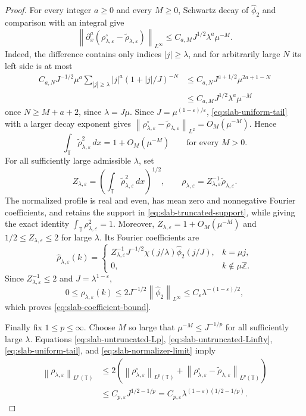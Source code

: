 \documentclass[12pt,reqno,letterpaper]{amsart}
\numberwithin{equation}{section}
\theoremstyle{definition}
\newcommand{\T}{\mathbb T}
\newcommand{\Z}{\mathbb Z}
\newcommand{\eps}{\varepsilon}
\newcommand{\la}{\lambda}
\newcommand{\norm}[1]{\left\lVert #1\right\rVert}
\newcommand{\abs}[1]{\left\lvert #1\right\rvert}
\begin{document}
\begin{proof}
For every integer $a\geq0$ and every $M\geq0$, Schwartz decay of
$\widehat\phi_2$ and comparison with an integral give
\begin{equation}\label{eq:slab-uniform-tail}
 \norm{\partial_x^a(\rho^\circ_{\la,\eps}
       -\widetilde\rho_{\la,\eps})}_{L^\infty}
 \leq C_{a,M}J^{1/2}\la^a\mu^{-M}.
\end{equation}
Indeed, the difference contains only indices $\abs j\geq\la$, and for
arbitrarily large $N$ its left side is at most
\begin{align*}
 C_{a,N}J^{-1/2}\mu^a
 \sum_{\abs j\geq\la}\abs j^a(1+\abs j/J)^{-N}
 &\leq C_{a,N}J^{a+1/2}\mu^{2a+1-N}\\
 &\leq C_{a,M}J^{1/2}\la^a\mu^{-M}
\end{align*}
once $N\geq M+a+2$, since $\la=J\mu$.
Since $J=\mu^{(1-\eps)/\eps}$, \eqref{eq:slab-uniform-tail} with a
larger decay exponent gives
$\norm{\rho^\circ_{\la,\eps}-\widetilde\rho_{\la,\eps}}_{L^2}
=O_M(\mu^{-M})$.  Hence
\begin{equation}\label{eq:slab-normalizer-limit}
 \int_\T\widetilde\rho_{\la,\eps}^2\,dx
 =1+O_M(\mu^{-M})
 \qquad\text{for every }M>0.
\end{equation}
For all sufficiently large admissible $\la$, set
\begin{equation*}
 Z_{\la,\eps}
 =\left(\int_\T\widetilde\rho_{\la,\eps}^2\,dx\right)^{1/2},
 \qquad
 \rho_{\la,\eps}
 =Z_{\la,\eps}^{-1}\widetilde\rho_{\la,\eps}.
\end{equation*}
The normalized profile is real and even, has mean zero and nonnegative
Fourier coefficients, and retains the support in
\eqref{eq:slab-truncated-support}, while giving the exact identity
$\int_\T\rho_{\la,\eps}^2=1$.  Moreover,
$Z_{\la,\eps}=1+O_M(\mu^{-M})$ and
$1/2\leq Z_{\la,\eps}\leq2$ for large $\la$.  Its Fourier coefficients are
\begin{equation*}
 \widehat\rho_{\la,\eps}(k)=
 \begin{cases}
  Z_{\la,\eps}^{-1}J^{-1/2}
  \chi(j/\la)\widehat\phi_2(j/J),&k=\mu j,\\
  0,&k\notin\mu\Z.
 \end{cases}
\end{equation*}
Since $Z_{\la,\eps}^{-1}\leq2$ and $J=\la^{1-\eps}$,
\[
 0\leq\widehat\rho_{\la,\eps}(k)
 \leq2J^{-1/2}\norm{\widehat\phi_2}_{L^\infty}
 \leq C_\eps\la^{-(1-\eps)/2},
\]
which proves \eqref{eq:slab-coefficient-bound}.

Finally fix $1\leq p\leq\infty$.  Choose $M$ so large that
$\mu^{-M}\leq J^{-1/p}$ for all sufficiently large $\la$.  Equations
\eqref{eq:slab-untruncated-Lp}, \eqref{eq:slab-untruncated-Linfty},
\eqref{eq:slab-uniform-tail}, and \eqref{eq:slab-normalizer-limit} imply
\begin{align*}
 \norm{\rho_{\la,\eps}}_{L^p(\T)}
 &\leq2\left(\norm{\rho^\circ_{\la,\eps}}_{L^p(\T)}
 +\norm{\rho^\circ_{\la,\eps}
 -\widetilde\rho_{\la,\eps}}_{L^p(\T)}\right)\\
 &\leq C_{p,\eps}J^{1/2-1/p}
 =C_{p,\eps}\la^{(1-\eps)(1/2-1/p)}.
\end{align*}
\end{proof}
\end{document}
